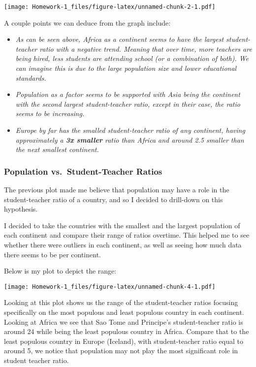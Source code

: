 \documentclass[
]{article}
\begin{document}
\texttt{[image: Homework-1\_files/figure-latex/unnamed-chunk-2-1.pdf]}

A couple points we can deduce from the graph include:

\begin{itemize}
\item
  \emph{As can be seen above, Africa as a continent seems to have the
  largest student-teacher ratio with a negative trend. Meaning that over
  time, more teachers are being hired, less students are attending
  school (or a combination of both). We can imagine this is due to the
  large population size and lower educational standards. }
\item
  \emph{Population as a factor seems to be supported with Asia being the
  continent with the second largest student-teacher ratio, except in
  their case, the ratio seems to be increasing.}
\item
  \emph{Europe by far has the smalled student-teacher ratio of any
  continent, having approximately a \textbf{3x smaller} ratio than
  Africa and around 2.5 smaller than the next smallest continent.}
\end{itemize}

\hypertarget{population-vs.-student-teacher-ratios}{%
\subsubsection{Population vs.~Student-Teacher
Ratios}\label{population-vs.-student-teacher-ratios}}

The previous plot made me believe that population may have a role in the
student-teacher ratio of a country, and so I decided to drill-down on
this hypothesis.

I decided to take the countries with the smallest and the largest
population of each continent and compare their range of ratios overtime.
This helped me to see whether there were outliers in each continent, as
well as seeing how much data there seems to be per continent.

Below is my plot to depict the range:

\texttt{[image: Homework-1\_files/figure-latex/unnamed-chunk-4-1.pdf]}

Looking at this plot shows us the range of the student-teacher ratios
focusing specifically on the most populous and least populous country in
each continent. Looking at Africa we see that Sao Tome and Principe's
student-teacher ratio is around 24 while being the least populous
country in Africa. Compare that to the least populous country in Europe
(Iceland), with student-teacher ratio equal to around 5, we notice that
population may not play the most significant role in student teacher
ratio.
\end{document}
